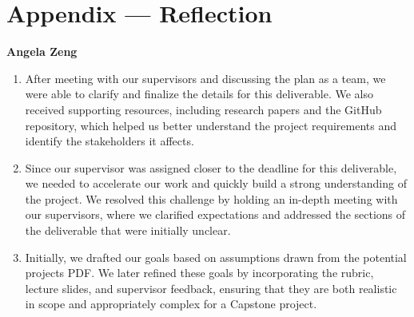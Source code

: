 \documentclass{article}
\begin{document}
\newpage{}

\section*{Appendix --- Reflection}

\textbf{Angela Zeng}
\begin{enumerate}
    \item After meeting with our supervisors and discussing the plan as a team, we were able to clarify and finalize the details for this deliverable. We also received supporting resources, including research papers and the GitHub repository, which helped us better understand the project requirements and identify the stakeholders it affects.  

    \item Since our supervisor was assigned closer to the deadline for this deliverable, we needed to accelerate our work and quickly build a strong understanding of the project. We resolved this challenge by holding an in-depth meeting with our supervisors, where we clarified expectations and addressed the sections of the deliverable that were initially unclear.  

    \item Initially, we drafted our goals based on assumptions drawn from the potential projects PDF. We later refined these goals by incorporating the rubric, lecture slides, and supervisor feedback, ensuring that they are both realistic in scope and appropriately complex for a Capstone project.  
\end{enumerate}
\end{document}
